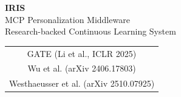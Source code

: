 \documentclass{article}
\begin{document}
\begin{center}
\vspace*{3cm}
{\Huge\bfseries IRIS}\\[0.5cm]
{\Large MCP Personalization Middleware}\\[1cm]
{\large Research-backed Continuous Learning System}\\[2cm]
\begin{tabular}{c}
GATE (Li et al., ICLR 2025)\\
Wu et al. (arXiv 2406.17803)\\
Westhaeusser et al. (arXiv 2510.07925)
\end{tabular}
\end{center}

\newpage

\end{document}
